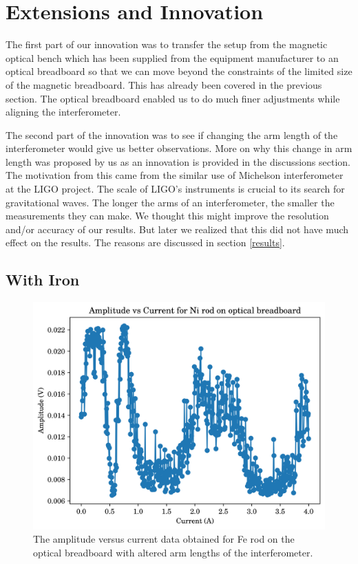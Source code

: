 \chapter{\label{method}Extensions and Innovation}
The first part of our innovation was to transfer the setup from the magnetic optical bench which has been supplied from the equipment manufacturer to an optical breadboard so that we can move beyond the constraints of the limited size of the magnetic breadboard. This has already been covered in the previous section. The optical breadboard enabled us to do much finer adjustments while aligning the interferometer. 


The second part of the innovation was to see if changing the arm length of the interferometer would give us better observations. More on why this change in arm length was proposed by us as an innovation is provided in the discussions section. The motivation from this came from the similar use of Michelson interferometer at the LIGO project. The scale of LIGO's instruments is crucial to its search for gravitational waves. The longer the arms of an interferometer, the smaller the measurements they can make. We thought this might improve the resolution and/or accuracy of our results. But later we realized that this did not have much effect on the results. The reasons are discussed in section \ref{results}.
\section{With Iron}
\begin{figure}
	\centering
	\includegraphics{data/ob-Fe-0}
	\caption{The amplitude versus current data obtained for Fe rod on the optical breadboard with altered arm lengths of the interferometer.}
	\label{fig:ob-fe-0}
\end{figure}

